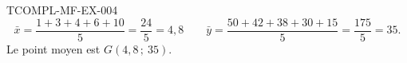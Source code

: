 \begin{corrige}{TCOMPL-MF-EX-004}
\[
  \bar{x} = \frac{1+3+4+6+10}{5} = \frac{24}{5} = 4{,}8
  \qquad
  \bar{y} = \frac{50+42+38+30+15}{5} = \frac{175}{5} = 35.
\]
Le point moyen est $G(4{,}8\,;\ 35)$.
\end{corrige}
